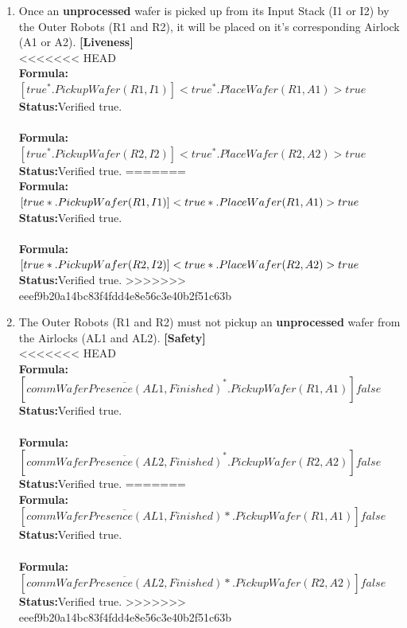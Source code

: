 \documentclass[a4paper,12pt]{article}
\begin{document}
\begin{enumerate}
		
		\item Once an \textbf{unprocessed} wafer is picked up from its Input Stack (I1 or I2) by the Outer Robots (R1 and R2), it will be placed on it's corresponding Airlock (A1 or A2). \textbf{[Liveness]}
		\\
<<<<<<< HEAD
		\\\textbf{Formula:} $[true^*.PickupWafer(R1,I1)] <true^*.PlaceWafer(R1,A1)>true$ \\\textbf{Status:}Verified true.
		\\
		\\\textbf{Formula:} $[true^*.PickupWafer(R2,I2)] <true^*.PlaceWafer(R2,A2)>true$ \\\textbf{Status:}Verified true.
=======
		\\\textbf{Formula:} $[true*.PickupWafer(R1,I1)] <true*.\\PlaceWafer(R1,A1)>true$ \\\textbf{Status:}Verified true.
		\\
		\\\textbf{Formula:} $[true*.PickupWafer(R2,I2)] <true*.\\PlaceWafer(R2,A2)>true$ \\\textbf{Status:}Verified true.
>>>>>>> eeef9b20a14bc83f4fdd4e8e56c3e40b2f51c63b
		
		
		\item The Outer Robots (R1 and R2) must not pickup an \textbf{unprocessed} wafer from the Airlocks (AL1 and AL2). \textbf{[Safety]}
		\\
<<<<<<< HEAD
		\\\textbf{Formula:} $[\overline{commWaferPresence(AL1,Finished)}^*.PickupWafer(R1,A1)]false $ \\\textbf{Status:}Verified true.
		\\
		\\\textbf{Formula:} $[\overline{commWaferPresence(AL2,Finished)}^*.PickupWafer(R2,A2)]false $ \\\textbf{Status:}Verified true.
=======
		\\\textbf{Formula:} $[\overline{commWaferPresence(AL1,Finished)}*.PickupWafer(R1,A1)]false $ \\\textbf{Status:}Verified true.
		\\
		\\\textbf{Formula:} $[\overline{commWaferPresence(AL2,Finished)}*.PickupWafer(R2,A2)]false $ \\\textbf{Status:}Verified true.
>>>>>>> eeef9b20a14bc83f4fdd4e8e56c3e40b2f51c63b
		

\end{enumerate}
\end{document}
